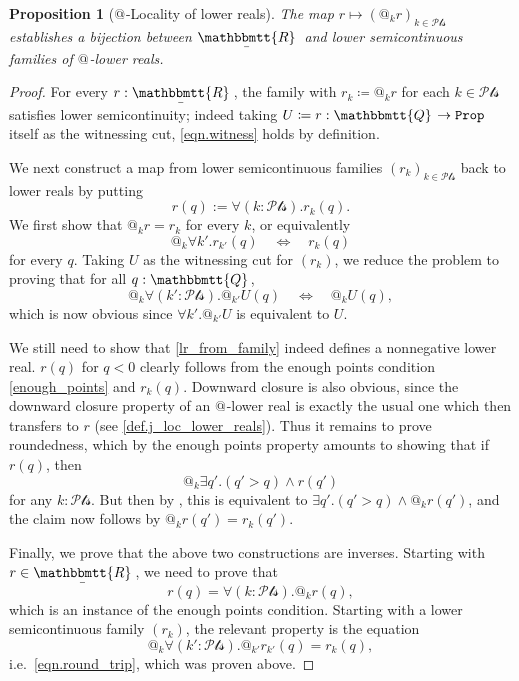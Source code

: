 \documentclass[11pt, oneside, article]{memoir}
\makeatletter
\theoremstyle{plain}
\newtheorem{proposition}[theorem]{Proposition}
\theoremstyle{definition}
\theoremstyle{remark}
\newcommand{\const}[1]{\mathtt{#1}}
\newcommand{\ubar}[1]{\underaccent{\bar}{#1}}
\newcommand{\internal}[1]{\raisebox{-.03ex}{$\mathbbmtt{#1}$}}
\newcommand{\hs}{\hspace{1.1pt}}
\newcommand{\tqq}{\internal{Q}\hs}
\newcommand{\trr}{\internal{R}\hs}
\newcommand{\tlrr}{\ubar{\trr}\hs}
\newcommand{\prop}{\const{Prop}}
\newcommand{\pt}{k}				%
\newcommand{\Pts}{\mathcal{Pts}}		%
\newcommand{\AtSymbol}{{@}}
\newcommand{\At}[1][\pt]{\AtSymbol_{#1}}
\makeatother
\begin{document}
\begin{proposition}[{$\At[]$-Locality of lower reals}]
	\label{prop:LR_locality}
	The map $r \mapsto (\At r)_{k\in\Pts}$ establishes a bijection between $\tlrr$ and lower semicontinuous families of $\At[]$-lower reals.
\end{proposition}

\begin{proof}
	For every $r : \tlrr$, the family with $r_k\coloneqq \At r$ for each $k\in\Pts$ satisfies lower semicontinuity; indeed taking $U\coloneqq r:\tqq\to\prop$ itself as the witnessing cut, \eqref{eqn.witness} holds by definition.

	We next construct a map from lower semicontinuous families $(r_\pt)_{\pt\in\Pts}$ back to lower reals by putting
	\begin{equation}
		\label{lr_from_family}
		r(q) := \forall (\pt : \Pts) . r_\pt(q).
	\end{equation}
	We first show that $\At r = r_\pt$ for every $\pt$, or equivalently
	\[
		\At \forall \pt' . r_{\pt'}(q) \quad \Longleftrightarrow \quad r_\pt(q)
	\]
	for every $q$. Taking $U$ as the witnessing cut for $(r_\pt)$, we reduce the problem to proving that for all $q:\tqq$,
	\begin{equation}\label{eqn.round_trip}
		\At \forall (\pt':\Pts) . \At[\pt'] U(q) \quad \Longleftrightarrow \quad \At U(q),
	\end{equation}
	which is now obvious since $\forall \pt' . \At[\pt'] U$ is equivalent to $U$.

	We still need to show that \eqref{lr_from_family} indeed defines a nonnegative lower real. $r(q)$ for $q < 0$ clearly follows from the enough points condition \cref{enough_points} and $r_k(q)$. Downward closure is also obvious, since the downward closure property of an $\At[]$-lower real is exactly the usual one which then transfers to $r$ (see \cref{def.j_loc_lower_reals}). Thus it remains to prove roundedness, which by the enough points property amounts to showing that if $r(q)$, then 
	\[
		\At \exists q'. (q' > q) \wedge r(q')
	\]
	for any $\pt : \Pts$. But then by , this is equivalent to $\exists q'. (q' > q)\wedge \At r(q')$, and the claim now follows by $\At r(q') = r_\pt(q')$.

	Finally, we prove that the above two constructions are inverses. Starting with $r \in \tlrr$, we need to prove that
	\[
		r(q) = \forall (\pt : \Pts) . \At r(q),
	\]
	which is an instance of the enough points condition. Starting with a lower semicontinuous family $(r_\pt)$, the relevant property is the equation
	\[
		\At \forall (\pt' : \Pts) . \At[\pt'] r_{\pt'}(q) = r_\pt(q),
	\]
	i.e.\ \eqref{eqn.round_trip}, which was proven above.
\end{proof}
\end{document}
